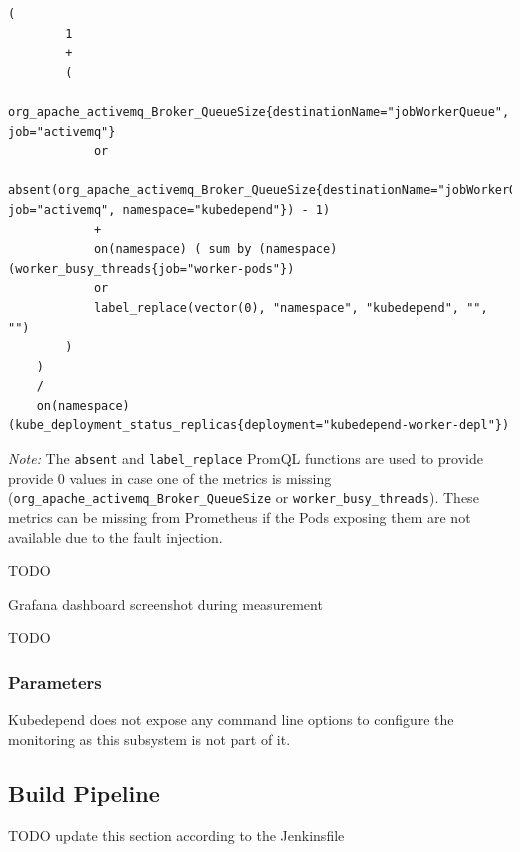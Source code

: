 \vspace{0.5cm}
\begin{minipage}{\linewidth}
	\begin{lstlisting}[caption={\texttt{needed\_worker\_ratio} defined in PromQL}, label={lst:promql-availability}]
	(
		1
		+
		(
			org_apache_activemq_Broker_QueueSize{destinationName="jobWorkerQueue", job="activemq"}
			or
			absent(org_apache_activemq_Broker_QueueSize{destinationName="jobWorkerQueue", job="activemq", namespace="kubedepend"}) - 1)
			+
			on(namespace) ( sum by (namespace) (worker_busy_threads{job="worker-pods"})
			or
			label_replace(vector(0), "namespace", "kubedepend", "", "")
		)
	)
	/
	on(namespace) (kube_deployment_status_replicas{deployment="kubedepend-worker-depl"})\end{lstlisting}
\end{minipage}

\emph{Note:} The \texttt{absent} and \texttt{label\_replace} PromQL functions are used to provide provide 0 values in case one of the metrics is missing (\texttt{org\_apache\_activemq\_Broker\_QueueSize} or \texttt{worker\_busy\_threads}). These metrics can be missing from Prometheus if the Pods exposing them are not available due to the fault injection.

TODO

Grafana dashboard screenshot during measurement

TODO


\subsubsection{Parameters}

Kubedepend does not expose any command line options to configure the monitoring as this subsystem is not part of it.

\subsection{Build Pipeline} \label{cicd}

TODO update this section according to the Jenkinsfile


